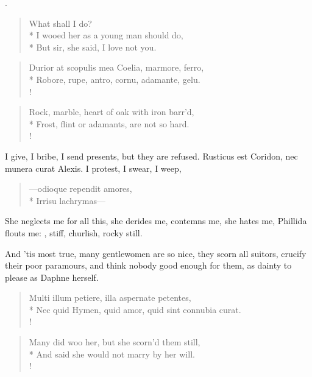 .

\begin{verse}
What shall I do?\\*
I wooed her as a young man should do,\\*
But sir, she said, I love not you.
\end{verse}

\begin{latin}%
\begin{verse}%
Durior at scopulis mea Coelia, marmore, ferro,\\*
Robore, rupe, antro, cornu, adamante, gelu.\\!
\end{verse}%
\end{latin}%
\translationrule%
\begin{verse}%
Rock, marble, heart of oak with iron barr'd,\\*
Frost, flint or adamants, are not so hard.\\!
\end{verse}%
%

I give, I bribe, I send presents, but they are refused. Rusticus
est Coridon, nec munera curat Alexis. I protest, I swear, I weep,
%
\begin{latin}%
\begin{verse}%
---odioque rependit amores,\\*
Irrisu lachrymas---
\end{verse}%
\end{latin}%
%

She neglects me for all this, she derides me, contemns me, she hates
me, Phillida flouts me: , stiff,
churlish, rocky still.

And 'tis most true, many gentlewomen are so nice, they scorn all
suitors, crucify their poor paramours, and think nobody good enough for
them, as dainty to please as Daphne herself.
%
\begin{latin}%
\begin{verse}%
Multi illum petiere, illa aspernate petentes,\\*
Nec quid Hymen, quid amor, quid sint connubia curat.\\!
\end{verse}%
\end{latin}%
\translationrule%
\begin{verse}%
Many did woo her, but she scorn'd them still,\\*
And said she would not marry by her will.\\!
\end{verse}%
%

